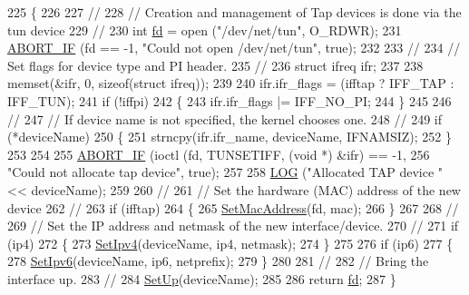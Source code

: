 \begin{DoxyCode}
225 \{
226 
227   \textcolor{comment}{//}
228   \textcolor{comment}{// Creation and management of Tap devices is done via the tun device}
229   \textcolor{comment}{//}
230   \textcolor{keywordtype}{int} \hyperlink{lte_2model_2fading-traces_2fading__trace__generator_8m_a44f21d5190b5a6df8089f54799628d7e}{fd} = open (\textcolor{stringliteral}{"/dev/net/tun"}, O\_RDWR);
231   \hyperlink{creator-utils_8h_a91c11c90ad2f1672fbd3c031038dce16}{ABORT\_IF} (fd == -1, \textcolor{stringliteral}{"Could not open /dev/net/tun"}, \textcolor{keyword}{true});
232 
233   \textcolor{comment}{//}
234   \textcolor{comment}{// Set flags for device type and PI header.}
235   \textcolor{comment}{//}
236   \textcolor{keyword}{struct }ifreq ifr;
237 
238   memset(&ifr,  0, \textcolor{keyword}{sizeof}(\textcolor{keyword}{struct} ifreq));
239 
240   ifr.ifr\_flags = (ifftap ? IFF\_TAP : IFF\_TUN);
241   \textcolor{keywordflow}{if} (!iffpi)
242     \{
243        ifr.ifr\_flags |= IFF\_NO\_PI;
244     \}
245 
246   \textcolor{comment}{//}
247   \textcolor{comment}{// If device name is not specified, the kernel chooses one.}
248   \textcolor{comment}{//}
249   \textcolor{keywordflow}{if} (*deviceName) 
250     \{
251        strncpy(ifr.ifr\_name, deviceName, IFNAMSIZ);
252     \}
253 
254   
255   \hyperlink{creator-utils_8h_a91c11c90ad2f1672fbd3c031038dce16}{ABORT\_IF} (ioctl (fd, TUNSETIFF, (\textcolor{keywordtype}{void} *) &ifr) == -1, 
256           \textcolor{stringliteral}{"Could not allocate tap device"}, \textcolor{keyword}{true});
257 
258   \hyperlink{creator-utils_8h_a158a8c64f24645c7478298399825737f}{LOG} (\textcolor{stringliteral}{"Allocated TAP device "} << deviceName);
259 
260   \textcolor{comment}{//}
261   \textcolor{comment}{// Set the hardware (MAC) address of the new device}
262   \textcolor{comment}{//}
263   \textcolor{keywordflow}{if} (ifftap)
264     \{
265       \hyperlink{tap-device-creator_8cc_ace2e6e4957bebb5dd5d93dcaa917cc19}{SetMacAddress}(fd, mac);
266     \}
267 
268   \textcolor{comment}{//}
269   \textcolor{comment}{// Set the IP address and netmask of the new interface/device.}
270   \textcolor{comment}{//}
271   \textcolor{keywordflow}{if} (ip4)
272     \{
273       \hyperlink{tap-device-creator_8cc_a44a9cb13d1cbecebf361fd7ccd1a374b}{SetIpv4}(deviceName, ip4, netmask);
274     \}
275 
276   \textcolor{keywordflow}{if} (ip6)
277     \{
278       \hyperlink{tap-device-creator_8cc_a102f6f0b268284e9849b029966bdff56}{SetIpv6}(deviceName, ip6, netprefix);
279     \}
280 
281   \textcolor{comment}{//}
282   \textcolor{comment}{// Bring the interface up.}
283   \textcolor{comment}{//}
284   \hyperlink{tap-device-creator_8cc_ab1a65327983ffdcbff3023b6fed670b9}{SetUp}(deviceName);
285 
286   \textcolor{keywordflow}{return} \hyperlink{lte_2model_2fading-traces_2fading__trace__generator_8m_a44f21d5190b5a6df8089f54799628d7e}{fd};
287 \}
\end{DoxyCode}


